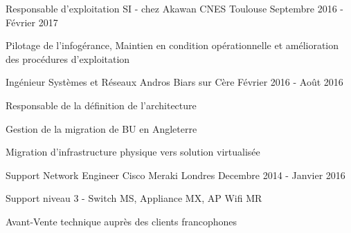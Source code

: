 \begin{cventries}
  \cventry
    {Responsable d'exploitation SI - chez Akawan} %
    {CNES} %
    {Toulouse} %
    {Septembre 2016 - Février 2017} %
    {
      \begin{cvitems} %
        \item {Pilotage de l'infogérance, Maintien en condition opérationnelle et amélioration des procédures d'exploitation}
      \end{cvitems}
    }
    
  \cventry
  {Ingénieur Systèmes et Réseaux} %
  {Andros} %
  {Biars sur Cère} %
  {Février 2016 - Août 2016} %
  {
    \begin{cvitems} %
      \item {Responsable de la définition de l'architecture}
      \item {Gestion de la migration de BU en Angleterre}
      \item {Migration d'infrastructure physique vers solution virtualisée}
    \end{cvitems}
}

  \cventry
    {Support Network Engineer} %
    {Cisco Meraki} %
    {Londres} %
    {Decembre 2014 - Janvier 2016} %
    {
      \begin{cvdoubleitems} %
        \item {Support niveau 3 - Switch MS, Appliance MX, AP Wifi MR}
        \item {Avant-Vente technique auprès des clients francophones}
      \end{cvdoubleitems}
    }

\end{cventries}

